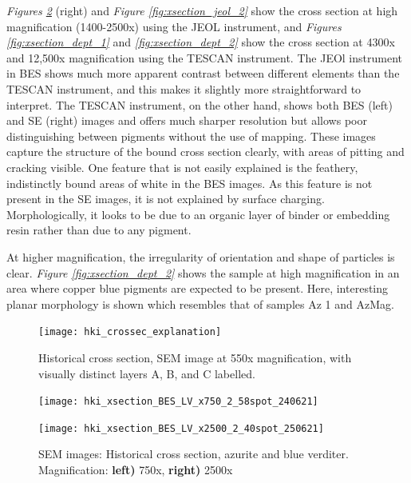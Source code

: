 \textit{Figures \ref{fig:xsection_jeol_1}} (right) and \textit{Figure \ref{fig:xsection_jeol_2}} show the cross section at high magnification (1400-2500x) using the JEOL instrument, and \textit{Figures \ref{fig:xsection_dept_1}} and \textit{\ref{fig:xsection_dept_2}} show the cross section at 4300x and 12,500x magnification using the TESCAN instrument. The JEOl instrument in BES shows much more apparent contrast between different elements than the TESCAN instrument, and this makes it slightly more straightforward to interpret. The TESCAN instrument, on the other hand, shows both BES (left) and SE (right) images and offers much sharper resolution but allows poor distinguishing between pigments without the use of mapping. These images capture the structure of the bound cross section clearly, with areas of pitting and cracking visible. One feature that is not easily explained is the feathery, indistinctly bound areas of white in the BES images. As this feature is not present in the SE images, it is not explained by surface charging. Morphologically, it looks to be due to an organic layer of binder or embedding resin rather than due to any pigment.

At higher magnification, the irregularity of orientation and shape of particles is clear. \textit{Figure \ref{fig:xsection_dept_2}} shows the sample at high magnification in an area where copper blue pigments are expected to be present. Here, interesting planar morphology is shown which resembles that of samples Az 1 and AzMag.

\begin{figure}[H]
\centering
  \texttt{[image: hki\_crossec\_explanation]}
\caption[Historical cross section with visually distinct layers A, B, and C labelled]{Historical cross section, SEM image at 550x magnification, with visually distinct layers A, B, and C labelled.}
\label{fig:hki_crossec_explanation}
\end{figure}

\begin{figure}[H]
\centering
\begin{minipage}{.45\textwidth}
  \centering
  \texttt{[image: hki\_xsection\_BES\_LV\_x750\_2\_58spot\_240621]}     
\end{minipage}
\begin{minipage}{.45\textwidth}
  \centering
  \texttt{[image: hki\_xsection\_BES\_LV\_x2500\_2\_40spot\_250621]}    
\end{minipage}
\caption[SEM images: Historical cross section, azurite and blue verditer]{SEM images: Historical cross section, azurite and blue verditer. Magnification: \textbf{left)} 750x, \textbf{right)} 2500x}
\label{fig:xsection_jeol_1}
\end{figure}

